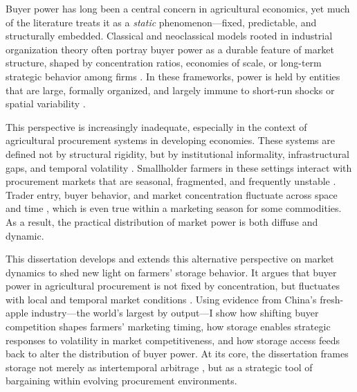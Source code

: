 \noindent
Buyer power has long been a central concern in agricultural economics, yet much of the literature treats it as a \textit{static} phenomenon---fixed, predictable, and structurally embedded. Classical and neoclassical models rooted in industrial organization theory often portray buyer power as a durable feature of market structure, shaped by concentration ratios, economies of scale, or long-term strategic behavior among firms \citep{sexton2013market}. In these frameworks, power is held by entities that are large, formally organized, and largely immune to short-run shocks or spatial variability \citep{sexton2010grocery}.

This perspective is increasingly inadequate, especially in the context of agricultural procurement systems in developing economies. These systems are defined not by structural rigidity, but by institutional informality, infrastructural gaps, and temporal volatility \citep{barrett2008agricultural}. Smallholder farmers in these settings interact with procurement markets that are seasonal, fragmented, and frequently unstable \citep{wang2020transaction}. Trader entry, buyer behavior, and market concentration fluctuate across space and time \citep{fafchamps2005selling, sitko2014exploitative, bergquist_dinerstein_2020}, which is even true within a marketing season for some commodities. As a result, the practical distribution of market power is both diffuse and dynamic.


This dissertation develops and extends this alternative perspective on market dynamics to shed new light on farmers' storage behavior. It argues that buyer power in agricultural procurement is not fixed by concentration, but fluctuates with local and temporal market conditions \citep{barrett2022agri}. Using evidence from China's fresh-apple industry---the world's largest by output---I show how shifting buyer competition shapes farmers' marketing timing, how storage enables strategic responses to volatility in market competitiveness, and how storage access feeds back to alter the distribution of buyer power. At its core, the dissertation frames storage not merely as intertemporal arbitrage \citep{burke2019sell, wright1982econ}, but as a strategic tool of bargaining within evolving procurement environments.



